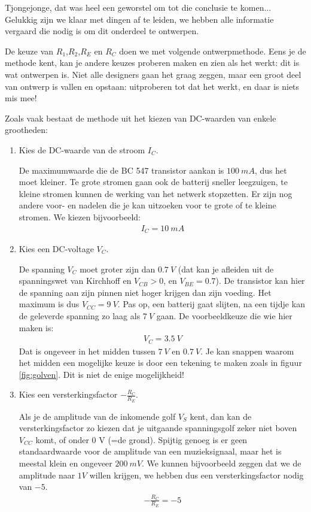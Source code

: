 \documentclass{article}
\begin{document}
				Tjongejonge, dat was heel een geworstel om tot die conclusie te komen... Gelukkig zijn we klaar met dingen af te leiden, we hebben alle informatie vergaard die nodig is om dit onderdeel te ontwerpen. 

				De keuze van $R_1$,$R_2$,$R_E$ en $R_C$ doen we met volgende ontwerpmethode. Eens je de methode kent, kan je andere keuzes proberen maken en zien als het werkt: dit is wat ontwerpen is. Niet alle designers gaan het graag zeggen, maar een groot deel van ontwerp is vallen en opstaan: uitproberen tot dat het werkt, en daar is niets mis mee!

				Zoals vaak bestaat de methode uit het kiezen van DC-waarden van enkele grootheden:
				\begin{enumerate}
					\item Kies de DC-waarde van de  stroom $I_C$. 

					De maximumwaarde die de BC 547 transistor aankan is $100~mA$, dus het moet kleiner. Te grote stromen gaan ook de batterij sneller leegzuigen, te kleine stromen kunnen de werking van het netwerk stopzetten. Er zijn nog  andere voor- en nadelen die je kan uitzoeken voor te grote of te kleine stromen. We kiezen bijvoorbeeld:
					\begin{align}
					    I_C = 10~mA
					\end{align}

					\item Kies een DC-voltage $V_C$.

					 De spanning $V_C$ moet groter zijn dan $0.7~V$ (dat kan je afleiden uit de spanningswet van Kirchhoff en  $V_{CB} > 0$, en $V_{BE} = 0.7$). De transistor kan hier de spanning aan zijn pinnen niet hoger krijgen dan zijn voeding. Het maximum is dus $V_{CC} = 9~V$. Pas op, een batterij gaat slijten, na een tijdje kan de geleverde spanning zo laag als $7~V$ gaan. De voorbeeldkeuze die wie hier maken is:
					\begin{align}
					    V_C =  3.5~V
					\end{align}
					 Dat is ongeveer in het midden tussen $7~V$ en $0.7~V$. Je kan snappen waarom het midden een mogelijke keuze is door een tekening te maken zoals in figuur \ref{fig:golven}. Dit is niet de enige mogelijkheid!

					\item Kies een versterkingsfactor $- \frac{R_C}{R_E}$. 

					Als je de amplitude van de inkomende golf $V_S$ kent, dan kan de versterkingsfactor zo kiezen dat je uitgaande spanningsgolf zeker niet boven $V_{CC}$ komt, of onder $0$ V (=de grond). Spijtig genoeg is er geen standaardwaarde voor de amplitude van een muzieksignaal, maar het is meestal klein en ongeveer  $200~mV$. We kunnen bijvoorbeeld zeggen dat we de amplitude naar $1V$ willen krijgen, we hebben dus een versterkingsfactor nodig van $-5$.
					\begin{align}
					    -\frac{R_C}{R_E} = -5
					\end{align}
				\end{enumerate}
\end{document}

